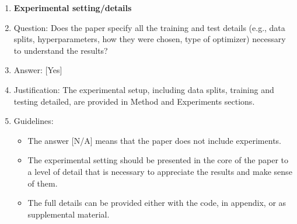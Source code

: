 \documentclass{llmxive}
\providecommand{\answerYes}[1][]{[Yes]#1}
\providecommand{\answerNo}[1][]{[No]#1}
\providecommand{\answerNA}[1][]{[N/A]#1}
\begin{document}
{\begin{enumerate}
\item {\bf Experimental setting/details}
    \item[] Question: Does the paper specify all the training and test details (e.g., data splits, hyperparameters, how they were chosen, type of optimizer) necessary to understand the results?
    \item[] Answer: \answerYes{} %
    \item[] Justification:  The experimental setup, including data splits, training and testing detailed, are provided in Method and Experiments sections.
    \item[] Guidelines:
    \begin{itemize}
        \item The answer \answerNA{} means that the paper does not include experiments.
        \item The experimental setting should be presented in the core of the paper to a level of detail that is necessary to appreciate the results and make sense of them.
        \item The full details can be provided either with the code, in appendix, or as supplemental material.
    \end{itemize}


\end{enumerate}}
\end{document}

